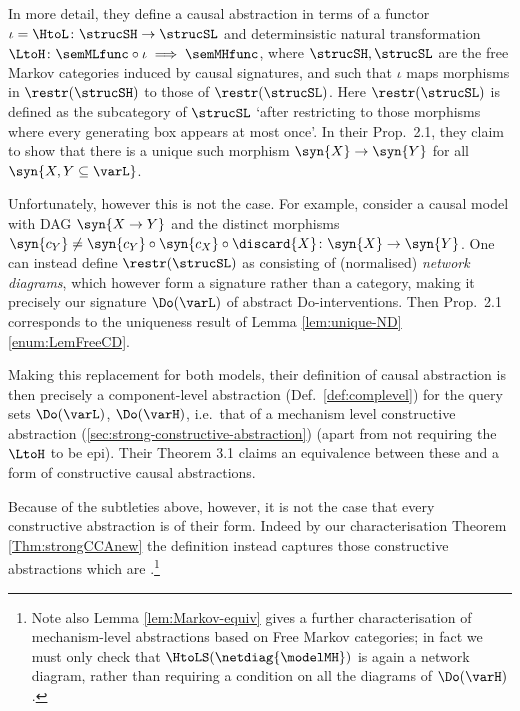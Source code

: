 \documentclass{article}
\begin{document}
{{In more detail, they define a causal abstraction in terms of a functor $\iota = \HtoL \colon \strucSH \to \strucSL$ and determinsistic natural transformation $\LtoH \colon \semMLfunc \circ \iota \implies \semMHfunc$, where $\strucSH, \strucSL$ are the free Markov categories induced by causal signatures, and such that $\iota$ maps morphisms in $\restr(\strucSH)$ to those of $\restr(\strucSL)$. Here $\restr(\strucSL)$ is defined as the subcategory of $\strucSL$ `after restricting to those morphisms where every generating box appears at most once'. In their Prop.~2.1, they claim to show that there is a unique such morphism $\syn{X} \to \syn{Y}$ for all  $\syn{X, Y \subseteq \varL}$. 

Unfortunately, however this is not the case. For example, consider a causal model with DAG $\syn{X \to Y}$ and the distinct morphisms $\syn{c_Y} \neq \syn{c_Y} \circ \syn{c_X} \circ \discard{X} \colon \syn{X} \to \syn{Y}$.
One can instead define $\restr(\strucSL)$ as consisting of (normalised) \emph{network diagrams}, which however form a signature rather than a category, making it precisely our signature $\Do(\varL)$ of abstract Do-interventions. Then Prop.~2.1 corresponds to the uniqueness result of Lemma \ref{lem:unique-ND} \eqref{enum:LemFreeCD}.

Making this replacement for both models,
their definition of causal abstraction is then precisely a component-level abstraction (Def.~\ref{def:complevel}) for the query sets $\Do(\varL)$, $\Do(\varH)$, i.e.~that of a mechanism level constructive abstraction (\ref{sec:strong-constructive-abstraction}) (apart from not requiring the $\LtoH$ to be epi). Their Theorem 3.1 claims an equivalence between these and a form of constructive causal abstractions. 

Because of the subtleties above, however, it is not the case that every constructive abstraction is of their form. Indeed by our characterisation Theorem \ref{Thm:strongCCAnew} the definition instead captures those constructive abstractions which are \extrastrong.\footnote{Note also Lemma \ref{lem:Markov-equiv} gives a further characterisation of mechanism-level abstractions based on Free Markov categories; in fact we must only check that $\HtoLS(\netdiag{\modelMH})$ is again a network diagram, rather than requiring a condition on all the diagrams of $\Do(\varH)$.} 

}}
\end{document}
